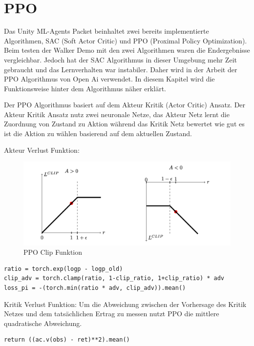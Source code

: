 {\chapter{PPO}}
\label{sec:ppo}
Das Unity ML-Agents Packet beinhaltet zwei bereits implementierte Algorithmen, SAC (Soft Actor Critic) und PPO (Proximal Policy Optimization). Beim testen der Walker Demo mit den zwei Algorithmen waren die Endergebnisse vergleichbar.
Jedoch hat der SAC Algorithmus in dieser Umgebung mehr Zeit gebraucht und das Lernverhalten war instabiler. Daher wird in der Arbeit der PPO Algorithmus von Open Ai verwendet. In diesem Kapitel wird die Funktionsweise hinter dem Algorithmus näher erklärt.

Der PPO Algorithmus basiert auf dem Akteur Kritik (Actor Critic) Ansatz. Der Akteur Kritik Ansatz nutz zwei neuronale Netze, das Akteur Netz lernt die Zuordnung von Zustand zu Aktion während das Kritik Netz bewertet wie gut es ist die Aktion zu wählen basierend auf dem aktuellen Zustand.

Akteur Verlust Funktion:
\begin{figure}[H]
  \centering  
  \includegraphics[scale=0.5]{img/ppo_clip.png}
  \caption{PPO Clip Funktion \protect\cite{schulman2017proximal}}
  \label{fig:ppo_clip}
\end{figure}

\begin{lstlisting}[caption={Codeausschnitt von Akteur Verlustfunktion aus Open Ai Spinning Up PPO implementation},captionpos=b]
ratio = torch.exp(logp - logp_old)
clip_adv = torch.clamp(ratio, 1-clip_ratio, 1+clip_ratio) * adv
loss_pi = -(torch.min(ratio * adv, clip_adv)).mean()
\end{lstlisting}

Kritik Verlust Funktion:
Um die Abweichung zwischen der Vorhersage des Kritik Netzes und dem tatsächlichen Ertrag zu messen nutzt PPO die mittlere quadratische Abweichung.
\begin{lstlisting}[caption={Codeausschnitt von Kritik Verlustfunktiion aus Open Ai Spinning Up PPO implementation},captionpos=b]
return ((ac.v(obs) - ret)**2).mean()
\end{lstlisting}
